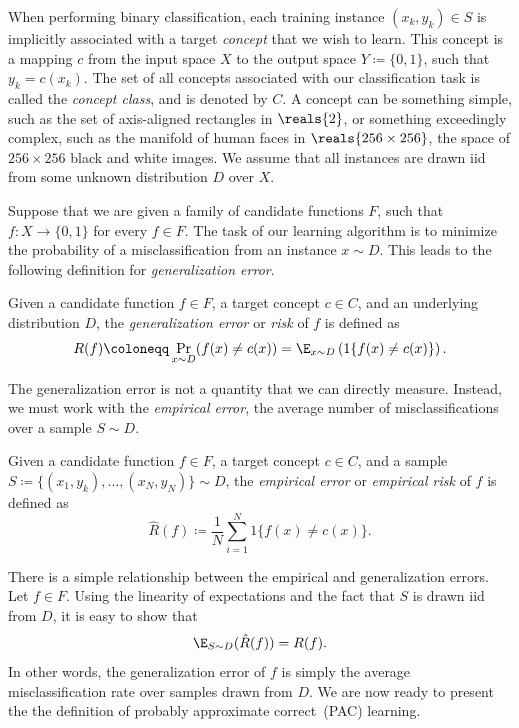\documentclass[11pt,a4paper]{article}
\numberwithin{equation}{section}
\newcommand{\ind}[1]{1\{#1\}}
\begin{document}
When performing binary classification, each training instance $(x_k, y_k) \in S$
is implicitly associated with a target \emph{concept} that we wish to learn.
This concept is a mapping $c$ from the input space $X$ to the output space $Y
\coloneqq \{0, 1\}$, such that $y_k = c(x_k)$. The set of all concepts
associated with our classification task is called the \emph{concept class}, and
is denoted by $C$. A concept can be something simple, such as the set of
axis-aligned rectangles in $\reals{2}$, or something exceedingly complex, such
as the manifold of human faces in $\reals{256 \times 256}$, the space of $256
\times 256$ black and white images. We assume that all instances are drawn iid
from some unknown distribution $D$ over $X$.

Suppose that we are given a family of candidate functions $F$, such that $f : X
\to \{0, 1\}$ for every $f \in F$. The task of our learning algorithm is to
minimize the probability of a misclassification from an instance $x \sim D$.
This leads to the following definition for \emph{generalization error}.

\begin{definition}
Given a candidate function $f \in F$, a target concept $c \in C$, and an
underlying distribution $D$, the \emph{generalization error} or \emph{risk} of
$f$ is defined as
\[
	R(f) \coloneqq \Pr_{x \sim D}(f(x) \neq c(x)) =
		\E_{x \sim D} \left(\ind{f(x) \neq c(x)}\right).
\]
\end{definition}

The generalization error is not a quantity that we can directly measure.
Instead, we must work with the \emph{empirical error}, the average number of
misclassifications over a sample $S \sim D$.

\begin{definition}
Given a candidate function $f \in F$, a target concept $c \in C$, and a sample
$S \coloneqq \{(x_1, y_k), \ldots, (x_N, y_N)\} \sim D$, the \emph{empirical
error} or \emph{empirical risk} of $f$ is defined as
\[
	\hat{R}(f) \coloneqq \frac{1}{N} \sum_{i = 1}^N \ind{f(x) \neq c(x)}.
\]
\end{definition}

There is a simple relationship between the empirical and generalization errors.
Let $f \in F$.  Using the linearity of expectations and the fact that $S$ is
drawn iid from $D$, it is easy to show that
\[
	\E_{S \sim D} (\hat{R}(f)) = R(f).
\]
In other words, the generalization error of $f$ is simply the average
misclassification rate over samples drawn from $D$. We are now ready to present
the the definition of probably approximate correct~(PAC) learning.
\end{document}
